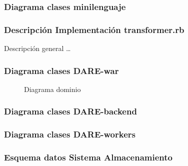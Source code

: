 \subsubsection{Diagrama clases minilenguaje}

\subsubsection{Descripción Implementación transformer.rb}
Descripción general \ldots{}

\subsubsection{Diagrama clases DARE-war}
\begin{figure}[!hbp]
\makebox[\textwidth]{\framebox[5cm]{\rule{0pt}{5cm}}}
\caption{Diagrama dominio}
\end{figure}

\subsubsection{Diagrama clases DARE-backend}
\subsubsection{Diagrama clases DARE-workers}

\subsubsection{Esquema datos Sistema Almacenamiento}
